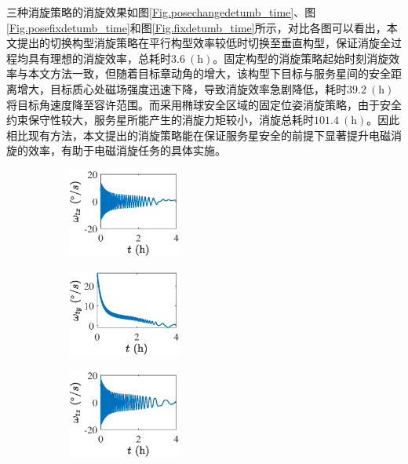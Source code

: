 \documentclass[lang=chs, degree=master, blindreview=false, winfonts=true]{yanputhesis}
\begin{document}
三种消旋策略的消旋效果如图\ref{Fig.posechangedetumb_time}、图\ref{Fig.posefixdetumb_time}和图\ref{Fig.fixdetumb_time}所示，对比各图可以看出，本文提出的切换构型消旋策略在平行构型效率较低时切换至垂直构型，保证消旋全过程均具有理想的消旋效率，总耗时$3.6\ (\mathrm{h})$。固定构型的消旋策略起始时刻消旋效率与本文方法一致，但随着目标章动角的增大，该构型下目标与服务星间的安全距离增大，目标质心处磁场强度迅速下降，导致消旋效率急剧降低，耗时$39.2\ (\mathrm{h})$将目标角速度降至容许范围。而采用椭球安全区域的固定位姿消旋策略，由于安全约束保守性较大，服务星所能产生的消旋力矩较小，消旋总耗时$101.4\ (\mathrm{h})$。因此相比现有方法，本文提出的消旋策略能在保证服务星安全的前提下显著提升电磁消旋的效率，有助于电磁消旋任务的具体实施。
\begin{figure}[htb!]
	\centering
	\begin{minipage}[t]{0.96\textwidth}
		\centering
		\begin{subfigure}[t]{0.23\textwidth}
			\centering
			\includegraphics[width = 1.475in]{picture/posechange_omega_x.eps}
			\caption{ }
			\label{fig:posechangedetumb_time(a)}
		\end{subfigure}\hfill
		\begin{subfigure}[t]{0.23\textwidth}
			\centering
			\includegraphics[width = 1.475in]{picture/posechange_omega_y.eps}
			\caption{ }
			\label{fig:posechangedetumb_time(c)}
		\end{subfigure}\hfill
		\begin{subfigure}[t]{0.23\textwidth}
			\centering
			\includegraphics[width = 1.475in]{picture/posechange_omega_z.eps}
			\caption{ }

\end{subfigure}
\end{minipage}
\end{figure}
\end{document}
